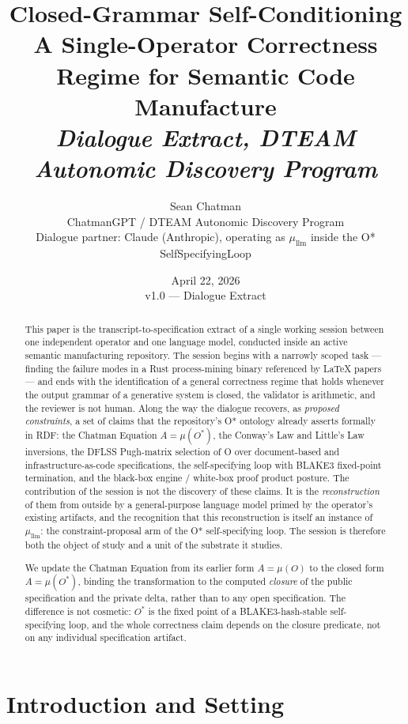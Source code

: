 \documentclass[11pt,letterpaper]{article}
\title{\vspace{-1cm}\Huge Closed-Grammar Self-Conditioning\\[0.4em]
\Large A Single-Operator Correctness Regime for Semantic Code Manufacture\\[0.8em]
\large \emph{Dialogue Extract, DTEAM Autonomic Discovery Program}}
\author{Sean Chatman\\ ChatmanGPT / DTEAM Autonomic Discovery Program\\
\small{Dialogue partner: Claude (Anthropic), operating as $\mu_{\mathrm{llm}}$ inside the O* SelfSpecifyingLoop}}
\date{April 22, 2026 \\ \small v1.0 --- Dialogue Extract}
\begin{document}
\maketitle
\thispagestyle{empty}

\begin{abstract}
This paper is the transcript-to-specification extract of a single working session between one independent operator and one language model, conducted inside an active semantic manufacturing repository. The session begins with a narrowly scoped task --- finding the failure modes in a Rust process-mining binary referenced by LaTeX papers --- and ends with the identification of a general correctness regime that holds whenever the output grammar of a generative system is closed, the validator is arithmetic, and the reviewer is not human. Along the way the dialogue recovers, as \emph{proposed constraints}, a set of claims that the repository's O* ontology already asserts formally in RDF: the Chatman Equation \( A = \mu(O^{\ast}) \), the Conway's Law and Little's Law inversions, the DFLSS Pugh-matrix selection of O\* over document-based and infrastructure-as-code specifications, the self-specifying loop with BLAKE3 fixed-point termination, and the black-box engine / white-box proof product posture. The contribution of the session is not the discovery of these claims. It is the \emph{reconstruction} of them from outside by a general-purpose language model primed by the operator's existing artifacts, and the recognition that this reconstruction is itself an instance of \(\mu_{\mathrm{llm}}\): the constraint-proposal arm of the O* self-specifying loop. The session is therefore both the object of study and a unit of the substrate it studies.

We update the Chatman Equation from its earlier form \( A = \mu(O) \) to the closed form \( A = \mu(O^{\ast}) \), binding the transformation to the computed \emph{closure} of the public specification and the private delta, rather than to any open specification. The difference is not cosmetic: \( O^{\ast} \) is the fixed point of a BLAKE3-hash-stable self-specifying loop, and the whole correctness claim depends on the closure predicate, not on any individual specification artifact.
\end{abstract}

\tableofcontents

\newpage

\section{Introduction and Setting}
\end{document}
